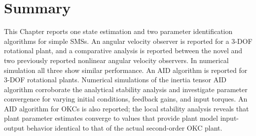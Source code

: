 \section{Summary}
\label{chSMS_ID.summary}


This Chapter reports one state estimation and two parameter
identification algorithms for simple \acfp{SMS}.
%
An angular velocity observer is reported for a 3-\ac{DOF} rotational
plant, and a comparative analysis is reported between the novel and
two previously reported nonlinear angular velocity observers.
%
In numerical simulation all three show similar performance.
%
An \ac{AID} algorithm is reported for 3-\ac{DOF} rotational plants.
%
Numerical simulations of the inertia tensor \ac{AID} algorithm
corroborate the analytical stability analysis and investigate
parameter convergence for varying initial conditions, feedback gains,
and input torques.
%
An \ac{AID} algorithm for \acp{OKC} is also reported; the
local stability analysis reveals that plant parameter estimates
converge to values that provide plant model input-output behavior
identical to that of the actual second-order \ac{OKC} plant.

 
